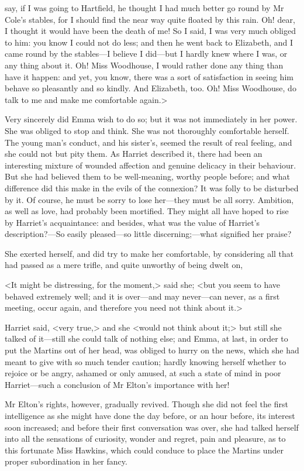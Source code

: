 say, if I was going to Hartfield, he thought I had much better go round by Mr Cole's stables, for I should find the near way quite floated by this rain. Oh! dear, I thought it would have been the death of me! So I said, I was very much obliged to him: you know I could not do less; and then he went back to Elizabeth, and I came round by the stables—I believe I did—but I hardly knew where I was, or any thing about it. Oh! Miss Woodhouse, I would rather done any thing than have it happen: and yet, you know, there was a sort of satisfaction in seeing him behave so pleasantly and so kindly. And Elizabeth, too. Oh! Miss Woodhouse, do talk to me and make me comfortable again.>

Very sincerely did Emma wish to do so; but it was not immediately in her power. She was obliged to stop and think. She was not thoroughly comfortable herself. The young man's conduct, and his sister's, seemed the result of real feeling, and she could not but pity them. As Harriet described it, there had been an interesting mixture of wounded affection and genuine delicacy in their behaviour. But she had believed them to be well-meaning, worthy people before; and what difference did this make in the evils of the connexion? It was folly to be disturbed by it. Of course, he must be sorry to lose her—they must be all sorry. Ambition, as well as love, had probably been mortified. They might all have hoped to rise by Harriet's acquaintance: and besides, what was the value of Harriet's description?—So easily pleased—so little discerning;—what signified her praise?

She exerted herself, and did try to make her comfortable, by considering all that had passed as a mere trifle, and quite unworthy of being dwelt on,

<It might be distressing, for the moment,> said she; <but you seem to have behaved extremely well; and it is over—and may never—can never, as a first meeting, occur again, and therefore you need not think about it.>

Harriet said, <very true,> and she <would not think about it;> but still she talked of it—still she could talk of nothing else; and Emma, at last, in order to put the Martins out of her head, was obliged to hurry on the news, which she had meant to give with so much tender caution; hardly knowing herself whether to rejoice or be angry, ashamed or only amused, at such a state of mind in poor Harriet—such a conclusion of Mr Elton's importance with her!

Mr Elton's rights, however, gradually revived. Though she did not feel the first intelligence as she might have done the day before, or an hour before, its interest soon increased; and before their first conversation was over, she had talked herself into all the sensations of curiosity, wonder and regret, pain and pleasure, as to this fortunate Miss Hawkins, which could conduce to place the Martins under proper subordination in her fancy.


